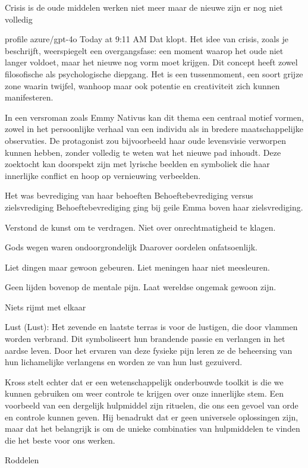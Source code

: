 Crisis is de oude middelen werken niet meer maar de nieuwe zijn er nog niet volledig

profile
azure/gpt-4o
Today at 9:11 AM
Dat klopt. Het idee van crisis, zoals je beschrijft, weerspiegelt een overgangsfase: een moment waarop het oude niet langer voldoet, maar het nieuwe nog vorm moet krijgen. Dit concept heeft zowel filosofische als psychologische diepgang. Het is een tussenmoment, een soort grijze zone waarin twijfel, wanhoop maar ook potentie en creativiteit zich kunnen manifesteren.

In een versroman zoals Emmy Nativus kan dit thema een centraal motief vormen, zowel in het persoonlijke verhaal van een individu als in bredere maatschappelijke observaties. De protagonist zou bijvoorbeeld haar oude levensvisie verworpen kunnen hebben, zonder volledig te weten wat het nieuwe pad inhoudt. Deze zoektocht kan doorspekt zijn met lyrische beelden en symboliek die haar innerlijke conflict en hoop op vernieuwing verbeelden.

Het was bevrediging
van haar behoeften
Behoeftebevrediging versus zielsvrediging
Behoeftebevrediging
ging bij geile Emma
boven haar zielsvrediging.

Verstond de kunst om te verdragen.
Niet over onrechtmatigheid te klagen.

Gods wegen waren ondoorgrondelijk
Daarover oordelen onfatsoenlijk.

Liet dingen maar gewoon gebeuren.
Liet meningen haar niet meesleuren.

Geen lijden bovenop de mentale pijn.
Laat wereldse ongemak gewoon zijn.

Niets rijmt met elkaar

Lust (Lust): Het zevende en laatste terras is voor de lustigen, die door vlammen worden verbrand. Dit symboliseert hun brandende passie en verlangen in het aardse leven. Door het ervaren van deze fysieke pijn leren ze de beheersing van hun lichamelijke verlangens en worden ze van hun lust gezuiverd.

Kross stelt echter dat er een wetenschappelijk onderbouwde toolkit is die we kunnen gebruiken om weer controle te krijgen over onze innerlijke stem. Een voorbeeld van een dergelijk hulpmiddel zijn rituelen, die ons een gevoel van orde en controle kunnen geven. Hij benadrukt dat er geen universele oplossingen zijn, maar dat het belangrijk is om de unieke combinaties van hulpmiddelen te vinden die het beste voor ons werken.

Roddelen

